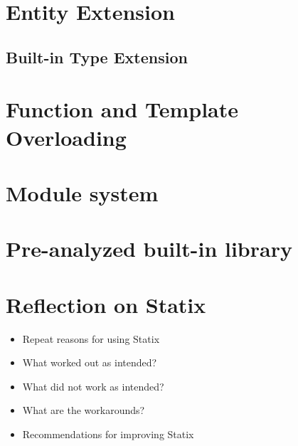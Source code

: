   \section{\label{sec:entity-extension}Entity Extension}

    \subsection{\label{subsec:type-extension}Built-in Type Extension}

  \section{\label{sec:function-template-overloading}Function and Template Overloading}

  \section{\label{sec:module-system}Module system}

  \section{\label{sec:built-in-library}Pre-analyzed built-in library}

  \section{\label{sec:statix-reflection}Reflection on Statix}

    \begin{itemize}
      \item Repeat reasons for using Statix
      \item What worked out as intended?
      \item What did not work as intended?
      \item What are the workarounds?
      \item Recommendations for improving Statix
    \end{itemize}
